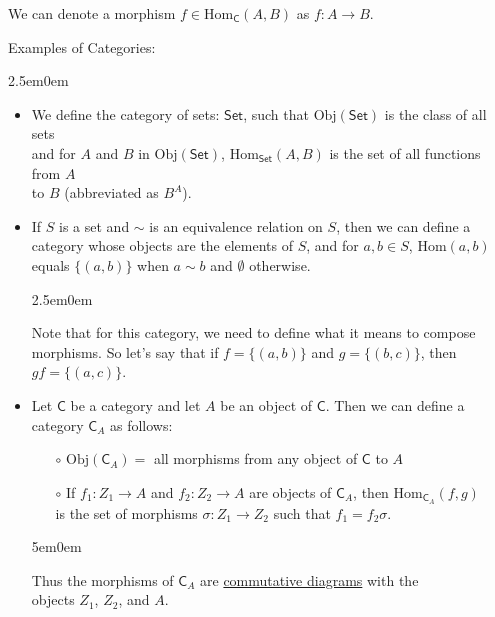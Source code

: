 \documentclass{book}
\newcommand{\exOne}{%
   \color{Purple}%
   \fontsize{14}{16}\selectfont%
}
\newcommand{\exTwo}{%
   \color{RedViolet}%
   \fontsize{13}{15}\selectfont%
}
\newcommand{\exP}{%
   \color{VioletRed}%
   \fontsize{12}{14}\selectfont%
}
\newenvironment{myIndent}{%
   \begin{adjustwidth}{2.5em}{0em}%
}{%
   \end{adjustwidth}%
}
\newenvironment{myDindent}{%
   \begin{adjustwidth}{5em}{0em}%
}{%
   \end{adjustwidth}%
}
\newcommand{\myObj}{\mathrm{Obj}}
\newcommand{\myHom}{\mathrm{Hom}}
\newcommand{\mcateg}[1]{{\bm{\mathsf{#1}}}}
\newcommand{\retTwo}{\hfill\bigbreak}
\begin{document}
   We can denote a morphism $f \in \myHom_\mcateg{C}(A, B)$ as $f: A \rightarrow B$.\retTwo

   \exOne
   Examples of Categories:
   \begin{myIndent} \exTwo
      \begin{itemize}
         \item We define the category of sets: $\mcateg{Set}$, such that $\myObj(\mcateg{Set})$ is the class of all sets\\ and for $A$ and $B$ in $\myObj(\mcateg{Set})$, $\myHom_\mcateg{Set}(A, B)$ is the set of all functions from $A$\\ to $B$ (abbreviated as $B^A$).\newpage
         
         \item If $S$ is a set and $\sim$ is an equivalence relation on $S$, then we can define a\\ category whose objects are the elements of $S$, and for $a, b \in S$, $\myHom(a, b)$\\ equals $\{(a, b)\}$ when $a \sim b$ and $\emptyset$ otherwise.
         {\begin{myIndent} \exP
            Note that for this category, we need to define what it means to compose\\ morphisms. So let's say that if $f = \{(a, b)\}$ and $g = \{(b, c)\}$, then\\ $gf = \{(a, c)\}$.\retTwo
         \end{myIndent}}

         \item Let $\mcateg{C}$ be a category and let $A$ be an object of $\mcateg{C}$. Then we can define a category $\mcateg{C}_A$ as follows:
         \begin{itemize}
            \item[$\circ$] $\myObj(\mcateg{C}_A) =$ all morphisms from any object of $\mcateg{C}$ to $A$
            \item[$\circ$] If $f_1: Z_1 \longrightarrow A$ and $f_2: Z_2 \longrightarrow A$ are objects of $\mcateg{C}_A$, then $\myHom_{\mcateg{C}_A}(f, g)$\\ is the set of morphisms $\sigma: Z_1 \rightarrow Z_2$ such that $f_1 = f_2\sigma$.
         \end{itemize}
         {\begin{myDindent} \exP
            Thus the morphisms of $\mcateg{C}_A$ are \ul{commutative diagrams} with the\\ objects $Z_1$, $Z_2$, and $A$.\\ [-12pt]


\end{myDindent}}
\end{itemize}
\end{myIndent}
\end{document}
